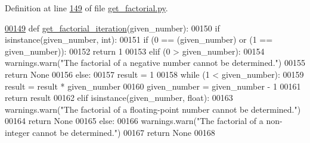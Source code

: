 Definition at line \hyperlink{get__factorial_8py_source_l00149}{149} of file \hyperlink{get__factorial_8py_source}{get\+\_\+factorial.\+py}.


\begin{DoxyCode}
\hypertarget{classutilities_1_1timing__measurements_1_1get__factorial_1_1calculate__factorial_l00149}{}\hyperlink{classutilities_1_1timing__measurements_1_1get__factorial_1_1calculate__factorial_a4233e6dad246c88e546c31f5752a1ee1}{00149}     \textcolor{keyword}{def }\hyperlink{classutilities_1_1timing__measurements_1_1get__factorial_1_1calculate__factorial_a4233e6dad246c88e546c31f5752a1ee1}{get\_factorial\_iteration}(given\_number):
00150         \textcolor{keywordflow}{if} isinstance(given\_number, int):
00151             \textcolor{keywordflow}{if} (0 == (given\_number) \textcolor{keywordflow}{or} (1 == given\_number)):
00152                 \textcolor{keywordflow}{return} 1
00153             \textcolor{keywordflow}{elif} (0 > given\_number):
00154                 warnings.warn(\textcolor{stringliteral}{"The factorial of a negative number cannot be determined."})
00155                 \textcolor{keywordflow}{return} \textcolor{keywordtype}{None}
00156             \textcolor{keywordflow}{else}:
00157                 result = 1
00158                 \textcolor{keywordflow}{while} (1 < given\_number):
00159                     result = result * given\_number
00160                     given\_number = given\_number - 1
00161                 \textcolor{keywordflow}{return} result
00162         \textcolor{keywordflow}{elif} isinstance(given\_number, float):
00163             warnings.warn(\textcolor{stringliteral}{"The factorial of a floating-point number cannot be determined."})
00164             \textcolor{keywordflow}{return} \textcolor{keywordtype}{None}
00165         \textcolor{keywordflow}{else}:
00166             warnings.warn(\textcolor{stringliteral}{"The factorial of a non-integer cannot be determined."})
00167             \textcolor{keywordflow}{return} \textcolor{keywordtype}{None}
00168 
\end{DoxyCode}
\hypertarget{classutilities_1_1timing__measurements_1_1get__factorial_1_1calculate__factorial_ad985135073d51b522bdfb4c5b5569456}{}
